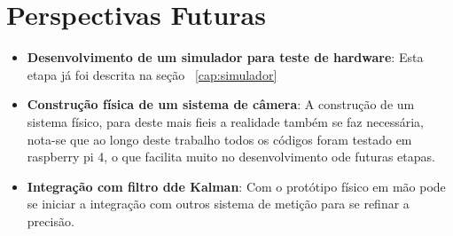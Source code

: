\section*{Perspectivas Futuras}

\begin{itemize}
	\item \textbf{Desenvolvimento de um simulador para teste de hardware}: Esta etapa já foi descrita na seção ~\ref{cap:simulador}
	\item \textbf{Construção física de um sistema de câmera}: A construção de um sistema físico, para deste mais fieis a realidade também se faz necessária, 
	nota-se que ao longo deste trabalho todos os códigos foram testado em raspberry pi 4, o que facilita muito no desenvolvimento ode futuras etapas. 
	\item \textbf{Integração com filtro dde Kalman}: Com o protótipo físico em mão pode se iniciar a integração com outros sistema de metição para se refinar a precisão.
\end{itemize}